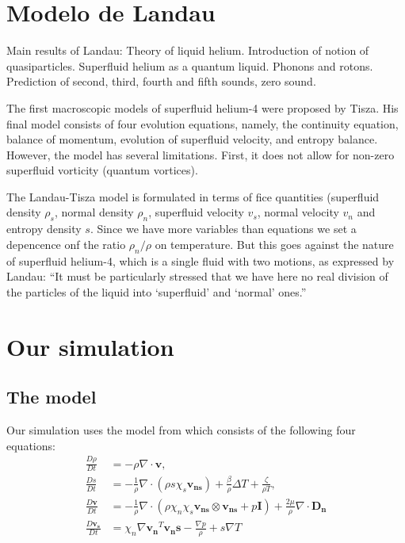 \documentclass{article}
\begin{document}
\section{Modelo de Landau}
\cite{Kincl}
Main results of Landau:
Theory of liquid helium. Introduction of notion of quasiparticles. Superfluid
helium as a quantum liquid. Phonons and rotons. Prediction of second, third,
fourth and fifth sounds, zero sound.

\cite{PhysRev.60.356}

The first macroscopic models of superfluid helium-4 were
proposed by Tisza. His final model consists of four evolution equations, namely, the continuity equation, balance of momentum, evolution of superfluid velocity, and entropy balance. However, the model has several limitations. First, it does not allow for non-zero superfluid vorticity (quantum vortices). 

The Landau-Tisza model is formulated in terms of fice quantities (superfluid density $\rho_s$, normal density $\rho_n$, superfluid velocity $v_s$, normal velocity $v_n$ and entropy density $s$. Since we have more variables than equations we set a depencence onf the ratio $\rho_n/\rho$ on temperature. But this goes against the nature of superfluid helium-4, which is a single fluid with two motions, as expressed by Landau: “It must be particularly stressed that we
have here no real division of the particles of the liquid into ‘superfluid’
and ‘normal’ ones.”

\section{Our simulation}
\subsection{The model}
Our simulation uses the model from\cite{Kincl} which consists of the following four equations:
\begin{align}
\frac{D\rho}{Dt} &= -\rho \nabla \cdot \mathbf{v}, \\
\frac{Ds}{Dt} &= -\frac{1}{\rho} \nabla \cdot (\rho s \chi_s \mathbf{v_{ns}}) + \frac{\beta}{\rho} \Delta T + \frac{\zeta}{\rho T} ,\\
\frac{D\mathbf{v}}{Dt} &= -\frac{1}{\rho} \nabla \cdot (\rho \chi_n \chi_s \mathbf{v_{ns}} \otimes \mathbf{v_{ns}} + p \mathbf{I}) + \frac{2 \mu}{\rho} \nabla \cdot \mathbf{D_n} \\
\frac{D\mathbf{v_s}}{Dt} &= \chi_n \nabla \mathbf{v_n}^T \mathbf{v_ns} - \frac{\nabla p}{\rho} + s \nabla T
\end{align}
\end{document}
